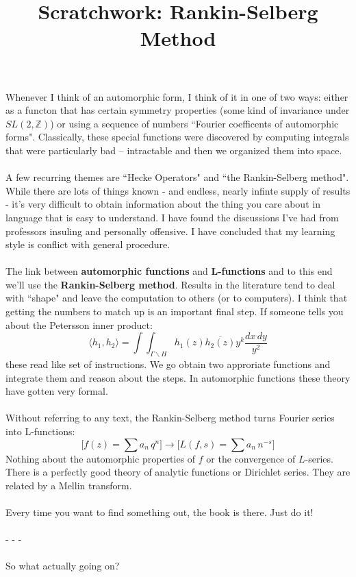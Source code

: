\documentclass[12pt]{article}
\title{Scratchwork: Rankin-Selberg Method}
\date{}
\begin{document}

\sffamily

\maketitle

\noindent Whenever I think of an automorphic form, I think of it in one of two ways: either as a functon that has certain symmetry properties (some kind of  invariance under $SL(2, \mathbb{Z})$) or using a sequence of numbers ``Fourier coefficents of automorphic forms".  Classically, these special functions were discovered by computing integrals that were particularly bad -- intractable and then we organized them into space. \\ \\
A few recurring themes are ``Hecke Operators" and ``the Rankin-Selberg method".  While there are lots of things known - and endless, nearly infinte supply of results - it's very difficult to obtain information about the thing you care about in language that is easy to understand.  I have found the discussions I've had from professors insuling and personally offensive.  I have concluded that my learning style is conflict with general procedure. \\ \\
The link between \textbf{automorphic functions}  and \textbf{L-functions} and to this end we'll use the \textbf{Rankin-Selberg method}.  Results in the literature tend to deal with ``shape" and leave the computation to others (or to computers).  I think that getting the numbers to match up is an important final step.  If someone tells you about the {\color{blue!50!white} Petersson inner product}:
$$ 
\langle h_1, h_2 \rangle 
= \int \int_{\Gamma \backslash H} 
h_1(z) \overline{h_2(z)} y^k \frac{dx\, dy}{y^2}$$
these read like set of instructions.  We go obtain two approriate functions and integrate them and reason about the steps.  In automorphic functions these theory have gotten very formal. \\ \\
Without referring to any text, the Rankin-Selberg method turns Fourier series into L-functions:
$$
\Big[ f(z) = \sum a_n \, q^n \Big] \to \Big[ 
L(f,s) = \sum a_n \, n^{-s} \Big] $$
Nothing about the automorphic properties of $f$ or the convergence of $L$-series.  There is a perfectly good theory of analytic functions or Dirichlet series.  They are related by a Mellin transform. \\ \\
Every time you want to find something out, the book is there. Just do it! \\ \\ 
- - - \\ \\
So what actually going on?
\vfill
\end{document}
